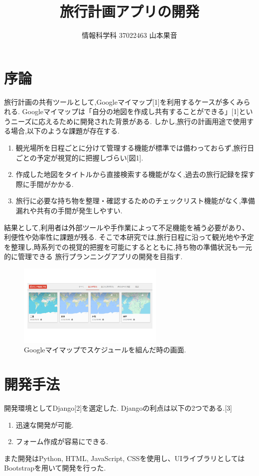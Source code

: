 \documentclass[a4j,twocolumn]{jsarticle}
\begin{document}
  \title{旅行計画アプリの開発}
  \author{情報科学科 \hspace{5mm} 37022463 \hspace{5mm} 山本果音}
  \date{}

  \maketitle


\section{序論}
\label{sec:org690327b}
旅行計画の共有ツールとして,Googleマイマップ[1]を利用するケースが多くみられる.
Googleマイマップは「自分の地図を作成し共有することができる」[1]というニーズに応えるために開発された背景がある.
しかし,旅行の計画用途で使用する場合,以下のような課題が存在する.
\begin{enumerate}
\item 観光場所を日程ごとに分けて管理する機能が標準では備わっておらず,旅行日ごとの予定が視覚的に把握しづらい[図1].
\item 作成した地図をタイトルから直接検索する機能がなく,過去の旅行記録を探す際に手間がかかる.
\item 旅行に必要な持ち物を整理・確認するためのチェックリスト機能がなく,準備漏れや共有の手間が発生しやすい.
\end{enumerate}
結果として,利用者は外部ツールや手作業によって不足機能を補う必要があり、利便性や効率性に課題が残る.
そこで本研究では,旅行日程に沿って観光地や予定を整理し,時系列での視覚的把握を可能にするとともに,持ち物の準備状況も一元的に管理できる
旅行プランニングアプリの開発を目指す.

\begin{figure}[htbp]
\centering
\includegraphics[width=7cm]{./figs/googlemymap1.png}
\caption{\label{fig:orge961aba}Googleマイマップでスケジュールを組んだ時の画面.}
\end{figure}


\section{開発手法}
\label{sec:org294f9cb}
開発環境としてDjango[2]を選定した.
Djangoの利点は以下の2つである.[3]
\begin{enumerate}
\item 迅速な開発が可能.
\item フォーム作成が容易にできる.
\end{enumerate}
また開発はPython, HTML, JavaScript, CSSを使用し、UIライブラリとしてはBootstrapを用いて開発を行った.
\end{document}

